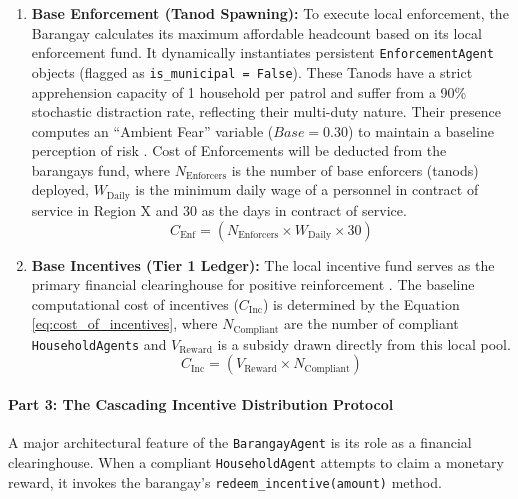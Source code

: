 \begin{enumerate}
    \item \textbf{Base Enforcement (Tanod Spawning):} To execute local enforcement, the Barangay calculates its maximum affordable headcount based on its local enforcement fund. It dynamically instantiates persistent \texttt{EnforcementAgent} objects (flagged as \texttt{is\_municipal = False}). These Tanods have a strict apprehension capacity of 1 household per patrol and suffer from a 90\% stochastic distraction rate, reflecting their multi-duty nature. Their presence computes an ``Ambient Fear'' variable ($Base = 0.30$) to maintain a baseline perception of risk \citep{Zhao2022}. Cost of Enforcements will be deducted from the barangays fund, where $N_{\mathrm{Enforcers}}$ is the number of base enforcers (tanods) deployed, $W_{\mathrm{Daily}}$ is the minimum daily wage of a personnel in contract of service in Region X and $30$ as the days in contract of service.
    \begin{equation}
        C_{\mathrm{Enf}} = (N_{\mathrm{Enforcers}} \times W_{\mathrm{Daily}} \times 30)
    \end{equation}
    \label{eq:cost_of_enforcement}
    \vspace{-20pt} 
    \item \textbf{Base Incentives (Tier 1 Ledger):} The local incentive fund serves as the primary financial clearinghouse for positive reinforcement \citep{Chen2023}. The baseline computational cost of incentives ($C_{\mathrm{Inc}}$) is determined by the Equation \ref{eq:cost_of_incentives}, where  $N_{\mathrm{Compliant}}$ are the number of compliant \texttt{HouseholdAgents} and $V_{\mathrm{Reward}}$ is a  subsidy drawn directly from this local pool.
    \begin{equation}
        C_{\mathrm{Inc}} = (V_{\mathrm{Reward}} \times N_{\mathrm{Compliant}})
    \end{equation}
    \label{eq:cost_of_incentives}
\end{enumerate}

\vspace{-45pt} %
\paragraph{Part 3: The Cascading Incentive Distribution Protocol}

A major architectural feature of the \texttt{BarangayAgent} is its role as a financial clearinghouse. When a compliant \texttt{HouseholdAgent} attempts to claim a monetary reward, it invokes the barangay's \texttt{redeem\_incentive(amount)} method.


